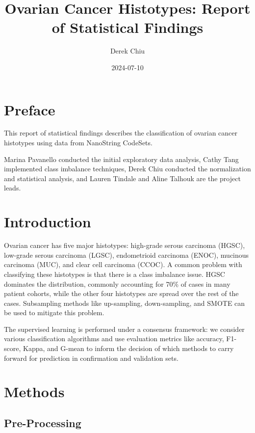 \documentclass[
]{report}
\title{Ovarian Cancer Histotypes: Report of Statistical Findings}
\author{Derek Chiu}
\date{2024-07-10}
\begin{document}
\maketitle

{
\hypersetup{linkcolor=}
\setcounter{tocdepth}{1}
\tableofcontents
}
\listoffigures
\listoftables
\chapter*{Preface}\label{preface}

This report of statistical findings describes the classification of ovarian cancer histotypes using data from NanoString CodeSets.

Marina Pavanello conducted the initial exploratory data analysis, Cathy Tang implemented class imbalance techniques, Derek Chiu conducted the normalization and statistical analysis, and Lauren Tindale and Aline Talhouk are the project leads.

\chapter{Introduction}\label{introduction}

Ovarian cancer has five major histotypes: high-grade serous carcinoma (HGSC), low-grade serous carcinoma (LGSC), endometrioid carcinoma (ENOC), mucinous carcinoma (MUC), and clear cell carcinoma (CCOC). A common problem with classifying these histotypes is that there is a class imbalance issue. HGSC dominates the distribution, commonly accounting for 70\% of cases in many patient cohorts, while the other four histotypes are spread over the rest of the cases. Subsampling methods like up-sampling, down-sampling, and SMOTE can be used to mitigate this problem.

The supervised learning is performed under a consensus framework: we consider various classification algorithms and use evaluation metrics like accuracy, F1-score, Kappa, and G-mean to inform the decision of which methods to carry forward for prediction in confirmation and validation sets.

\chapter{Methods}\label{methods}

\section{Pre-Processing}\label{pre-processing}
\end{document}
